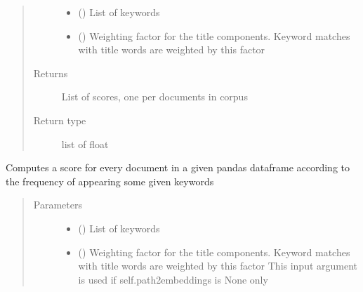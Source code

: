 \documentclass[letterpaper,10pt,english]{sphinxmanual}
\begin{document}
\begin{fulllineitems}
\begin{fulllineitems}
\begin{quote}
\begin{description}
\begin{itemize}
\item {} 
\sphinxAtStartPar
{} () \textendash{} List of keywords

\item {} 
\sphinxAtStartPar
{} () \textendash{} Weighting factor for the title components. Keyword matches with
title words are weighted by this factor

\end{itemize}

\item[{Returns}] \leavevmode
\sphinxAtStartPar
{} \textendash{} List of scores, one per documents in corpus

\item[{Return type}] \leavevmode
\sphinxAtStartPar
list of float

\end{description}\end{quote}

\end{fulllineitems}


\begin{fulllineitems}
\label{\detokenize{dc_preprocessor:src.domain_classifier.preprocessor.CorpusDFProcessor.score_by_keywords}}
\sphinxAtStartPar
Computes a score for every document in a given pandas dataframe
according to the frequency of appearing some given keywords
\begin{quote}\begin{description}
\item[{Parameters}] \leavevmode\begin{itemize}
\item {} 
\sphinxAtStartPar
{} () \textendash{} List of keywords

\item {} 
\sphinxAtStartPar
{} () \textendash{} Weighting factor for the title components. Keyword matches with
title words are weighted by this factor
This input argument is used if self.path2embeddings is None only


\end{itemize}
\end{description}
\end{quote}
\end{fulllineitems}
\end{fulllineitems}
\end{document}
